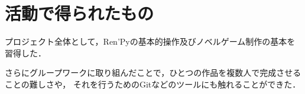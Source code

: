 \section{活動で得られたもの}
  プロジェクト全体として，Ren'Pyの基本的操作及びノベルゲーム制作の基本を習得した．
 
  さらにグループワークに取り組んだことで，ひとつの作品を複数人で完成させることの難しさや，
  それを行うためのGitなどのツールにも触れることができた．
